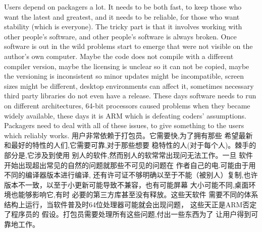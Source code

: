 Users depend on packagers a lot. It needs to be both fast, to keep those who
want the latest and greatest, and it needs to be reliable, for those who want
stability (which is everyone). The tricky part is that it involves working with
other people’s software, and other people’s software is always broken. Once
software is out in the wild problems start to emerge that were not visible on
the author’s own computer. Maybe the code does not compile with a different
compiler version, maybe the licensing is unclear so it can not be copied, maybe
the versioning is inconsistent so minor updates might be incompatible, screen
sizes might be different, desktop environments can affect it, sometimes
necessary third party libraries do not even have a release. These days software
needs to run on different architectures, 64-bit processors caused problems when
they became widely available, these days it is ARM which is defeating coders’
assumptions. Packagers need to deal with all of these issues, to give something
to the users which reliably works.
用户非常依赖于打包员。它需要快,为了拥有那些
希望最新和最好的特性的人们,它需要可靠,对于那些想要
稳特性的人(对于每个人)。棘手的部分是,它涉及到使用
别人的软件,然而别人的软常常出现问无法工作。一旦
软件开始出现超出常见的自然的问题就那些不可见的问题在
作者自己的电.可能由于用不同的编译器版本进行编译,
还有许可证不够明确以至于不能（被别人）复制,也许
版本不一致，以至于小更新可能导致不兼容，也有可能屏幕
大小可能不同,桌面环境也能够影响它,有时
必要的第三方库甚至没有释放。这些天软件
需要不同的体系结构上运行，当软件普及时64位处理器可能就会出现问题，
这些天正是ARM否定了程序员的
假设。打包员需要处理所有这些问题,付出一些东西为了
让用户得到可靠地工作。

